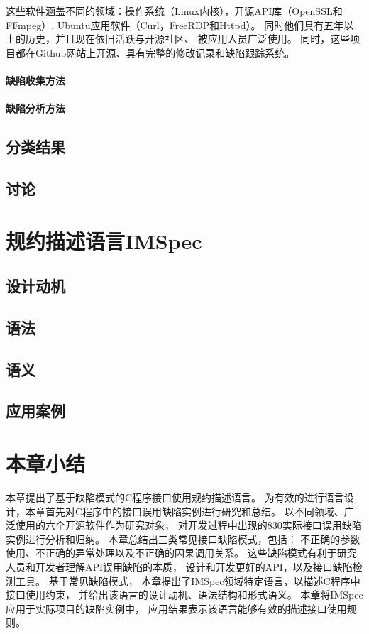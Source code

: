 这些软件涵盖不同的领域：操作系统（Linux内核），开源API库（OpenSSL和FFmpeg）,
Ubuntu应用软件（Curl，FreeRDP和Httpd）。
同时他们具有五年以上的历史，并且现在依旧活跃与开源社区、
被应用人员广泛使用。
同时，这些项目都在Github网站上开源、具有完整的修改记录和缺陷跟踪系统。



\paragraph{缺陷收集方法}

\paragraph{缺陷分析方法}

\subsection{分类结果}

\subsection{讨论}

\section{规约描述语言IMSpec}
\label{sec:2.4}
\subsection{设计动机}
\subsection{语法}
\subsection{语义}
\subsection{应用案例}


\section{本章小结}
\label{sec:2.5}
本章提出了基于缺陷模式的C程序接口使用规约描述语言。
为有效的进行语言设计，本章首先对C程序中的接口误用缺陷实例进行研究和总结。
以不同领域、广泛使用的六个开源软件作为研究对象，
对开发过程中出现的830实际接口误用缺陷实例进行分析和归纳。
本章总结出三类常见接口缺陷模式，包括：
不正确的参数使用、不正确的异常处理以及不正确的因果调用关系。
这些缺陷模式有利于研究人员和开发者理解API误用缺陷的本质，
设计和开发更好的API，以及接口缺陷检测工具。
基于常见缺陷模式，
本章提出了IMSpec领域特定语言，以描述C程序中接口使用约束，
并给出该语言的设计动机、语法结构和形式语义。
本章将IMSpec应用于实际项目的缺陷实例中，
应用结果表示该语言能够有效的描述接口使用规则。